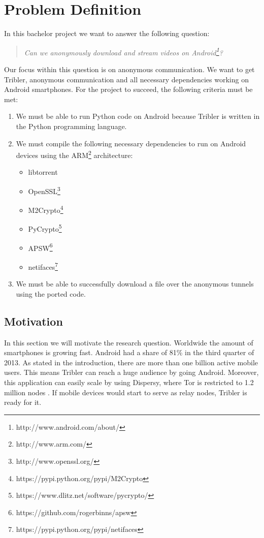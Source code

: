 \chapter{Problem Definition}
\label{cpt:problemdefinition}

In this bachelor project we want to answer the following question:

\begin{quote}
\emph{Can we anonymously download and stream videos on Android\footnote{http://www.android.com/about/}?}
\end{quote}

Our focus within this question is on anonymous communication. We want to get Tribler, anonymous communication and all necessary dependencies working on Android smartphones. For the project to succeed, the following criteria must be met:
\begin{enumerate}
\item We must be able to run Python code on Android because Tribler is written in the Python programming language.
\item We must compile the following necessary dependencies to run on Android devices using the ARM\footnote{http://www.arm.com/} architecture:
\begin{itemize}
\item libtorrent
\item OpenSSL\footnote{http://www.openssl.org/}
\item M2Crypto\footnote{https://pypi.python.org/pypi/M2Crypto}
\item PyCrypto\footnote{https://www.dlitz.net/software/pycrypto/}
\item APSW\footnote{https://github.com/rogerbinns/apsw}
\item netifaces\footnote{https://pypi.python.org/pypi/netifaces}
\end{itemize}
\item We must be able to successfully download a file over the anonymous tunnels using the ported code.
\end{enumerate}

\section{Motivation}
	\label{sec:motivation}
		In this section we will motivate the research question. Worldwide the amount of smartphones is growing fast. Android had a share of 81\% in the third quarter of 2013\cite{forbesandroidmarket}. As stated in the introduction, there are more than one billion active mobile users. This means Tribler can reach a huge audience by going Android. Moreover, this application can easily scale by using Dispersy, where Tor is restricted to 1.2 million nodes \cite{mclachlan2009scalable}. If mobile devices would start to serve as relay nodes, Tribler is ready for it.
		